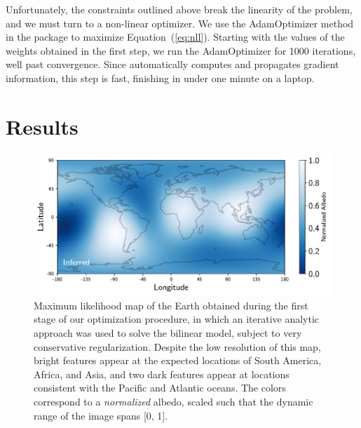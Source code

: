 \documentclass[modern]{aastex62}
\begin{document}
Unfortunately, the constraints outlined above break the linearity 
of the problem, and we must turn to a non-linear optimizer. We use the 
\textsf{AdamOptimizer} method in the \tf package \citep{Abadi2015}
to maximize Equation~(\ref{eq:nll}). Starting with the values of the
weights obtained in the first step, we run the \textsf{AdamOptimizer}
for 1000 iterations, well past convergence. Since \tf automatically
computes and propagates gradient information, this step is fast, 
finishing in under one minute on a laptop.

\section{Results}
\label{sec:results}

\begin{figure}[t!]
    \begin{centering}
    \includegraphics[width=\linewidth]{figures/map_L2.pdf}
    \caption{\label{fig:map_L2}
             Maximum likelihood map of the Earth obtained during the first
             stage of our optimization procedure, in which an iterative
             analytic approach was used to solve the bilinear model, 
             subject to very conservative regularization. Despite the low
             resolution of this map, bright features appear at the 
             expected locations of South America, Africa, and Asia, 
             and two dark features appear at locations consistent with
             the Pacific and Atlantic oceans. The colors correspond
             to a \emph{normalized} albedo, scaled such that the dynamic
             range of the image spans [0, 1].       
             }
    \end{centering}
\end{figure}
\end{document}
